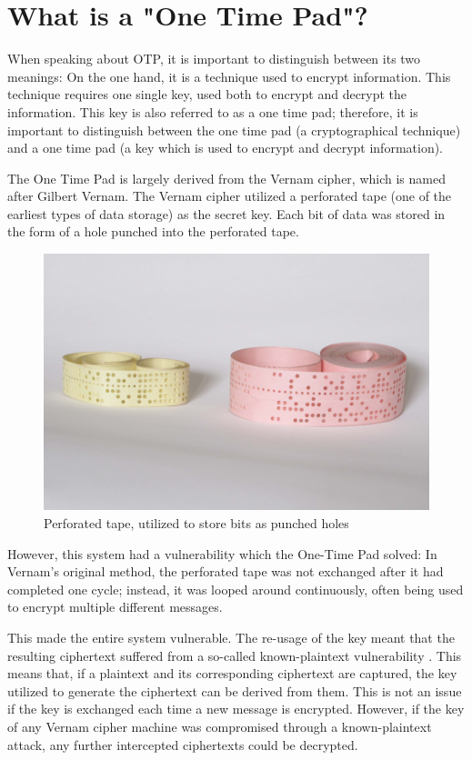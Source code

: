 \documentclass[12pt]{report}
\theoremstyle{definition}
\theoremstyle{remark}
\begin{document}
\section{What is a "One Time Pad"?}
When speaking about OTP, it is important to distinguish between its two meanings: On the one hand, it is a technique used to encrypt information. This technique requires one single key, used both to encrypt and decrypt the information. This key is also referred to as a one time pad; therefore, it is important to distinguish between the one time pad (a cryptographical technique) and a one time pad (a key which is used to encrypt and decrypt information).

The One Time Pad is largely derived from the Vernam cipher, which is named after Gilbert Vernam. The Vernam cipher utilized a perforated tape (one of the earliest types of data storage) as the secret key\cite{VernamPatent}. Each bit of data was stored in the form of a hole punched into the perforated tape.

\begin{figure}[H]
\centering
\includegraphics[scale=0.5]{PerforatedTape}
\caption{Perforated tape, utilized to store bits as punched holes}
\end{figure}

However, this system had a vulnerability which the One-Time Pad solved: In Vernam's original method, the perforated tape was not exchanged after it had completed one cycle; instead, it was looped around continuously, often being used to encrypt multiple different messages.

This made the entire system vulnerable. The re-usage of the key meant that the resulting ciphertext suffered from a so-called known-plaintext vulnerability \cite{HutSix}. This means that, if a plaintext and its corresponding ciphertext are captured, the key utilized to generate the ciphertext can be derived from them. This is not an issue if the key is exchanged each time a new message is encrypted. However, if the key of any Vernam cipher machine was compromised through a known-plaintext attack, any further intercepted ciphertexts could be decrypted.
\end{document}
